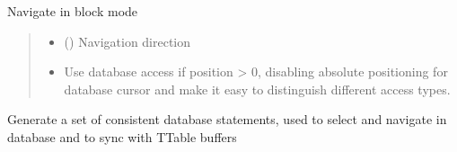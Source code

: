 \documentclass[letterpaper,10pt,english]{sphinxmanual}
\begin{document}
\begin{savenotes}
\begin{fulllineitems}
\begin{savenotes}\begin{fulllineitems}
\label{\detokenize{eezz:eezz.database.TDatabaseTable.navigate}}
\pysigstartsignatures
{}
\pysigstopsignatures
\sphinxAtStartPar
Navigate in block mode
\begin{quote}\begin{description}
\begin{itemize}
\item {} 
\sphinxAtStartPar
{} ({\hyperref[\detokenize{eezz:eezz.table.TNavigation}]{}}) \textendash{} Navigation direction

\item {} 
\sphinxAtStartPar
{} \textendash{} Use database access if position \textgreater{} 0, disabling absolute positioning for database cursor        and make it easy to distinguish different access types.

\end{itemize}

\end{description}\end{quote}

\end{fulllineitems}\end{savenotes}


\begin{savenotes}\begin{fulllineitems}
\label{\detokenize{eezz:eezz.database.TDatabaseTable.prepare_statements}}
\pysigstartsignatures
{}
\pysigstopsignatures
\sphinxAtStartPar
Generate a set of consistent database statements, used to select and navigate in database
and to sync with TTable buffers

\end{fulllineitems}\end{savenotes}


\end{fulllineitems}\end{savenotes}
\end{document}
